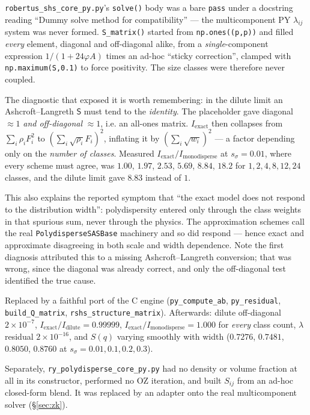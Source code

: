 \documentclass[11pt,a4paper]{article}
\newcommand{\code}[1]{\texttt{\hspace{0pt}#1}}
\begin{document}
\begin{enumerate}
\code{robertus\_shs\_core\_py.py}'s \code{solve()} body was a bare
\code{pass} under a docstring reading ``Dummy solve method for
compatibility'' --- the multicomponent PY $\lambda_{ij}$ system was never
formed. \code{S\_matrix()} started from \code{np.ones((p,p))} and filled
\emph{every} element, diagonal and off-diagonal alike, from a
\emph{single}-component expression $1/(1+24\varphi A)$ times an ad-hoc
``sticky correction'', clamped with \code{np.maximum(S,0.1)} to force
positivity. The size classes were therefore never coupled.

The diagnostic that exposed it is worth remembering: in the dilute limit an
Ashcroft--Langreth $\mathsf{S}$ must tend to the \emph{identity}. The
placeholder gave diagonal $\approx1$ \emph{and off-diagonal} $\approx1$, i.e.
an all-ones matrix. $I_{\text{exact}}$ then collapses from
$\sum_i\rho_iF_i^2$ to $(\sum_i\sqrt{\rho_i}F_i)^2$, inflating it by
$(\sum_i\sqrt{w_i})^2$ --- a factor depending only on the \emph{number of
classes}. Measured $I_{\text{exact}}/I_{\text{monodisperse}}$ at
$s_\sigma=0.01$, where every scheme must agree, was $1.00$, $1.97$, $2.53$,
$5.69$, $8.84$, $18.2$ for $1,2,4,8,12,24$ classes, and the dilute limit gave
$8.83$ instead of $1$.

This also explains the reported symptom that ``the exact model does not
respond to the distribution width'': polydispersity entered only through the
class weights in that spurious sum, never through the physics. The
approximation schemes call the real \code{PolydisperseSASBase} machinery and
so did respond --- hence exact and approximate disagreeing in both scale and
width dependence. Note the first diagnosis attributed this to a missing
Ashcroft--Langreth conversion; that was wrong, since the diagonal was already
correct, and only the off-diagonal test identified the true cause.

Replaced by a faithful port of the C engine (\code{py\_compute\_ab},
\code{py\_residual}, \code{build\_Q\_matrix},
\code{rshs\_structure\_matrix}). Afterwards: dilute off-diagonal
$2\times10^{-7}$, $I_{\text{exact}}/I_{\text{dilute}} = 0.99999$,
$I_{\text{exact}}/I_{\text{monodisperse}} = 1.000$ for \emph{every} class
count, $\lambda$ residual $2\times10^{-16}$, and $S(q)$ varying smoothly with
width ($0.7276$, $0.7481$, $0.8050$, $0.8760$ at
$s_\sigma=0.01,0.1,0.2,0.3$).

Separately, \code{ry\_polydisperse\_core\_py.py} had no density or volume
fraction at all in its constructor, performed no OZ iteration, and built
$S_{ij}$ from an ad-hoc closed-form blend. It was replaced by an adapter onto
the real multicomponent solver (\S\ref{sec:zk}).


\end{enumerate}
\end{document}
